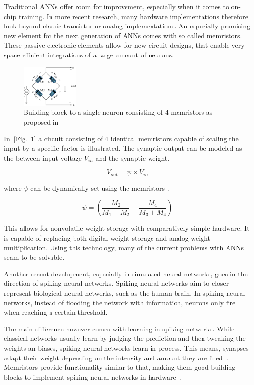 \documentclass[conference]{IEEEtran}
\begin{document}
    Traditional ANNs offer room for improvement, especially when it comes to on-chip training.
    In more recent research, many hardware implementations therefore look beyond classic transistor or analog implementations.
    An especially promising new element for the next generation of ANNs comes with so called memristors.
    These passive electronic elements allow for new circuit designs, that enable very space efficient integrations of a large amount of neurons.

    \begin{figure}[h]
        \centering
        \includegraphics[width=0.25\textwidth]{resources/memristor.png}
        \caption{Building block to a single neuron consisting of 4 memristors as proposed in \cite[Fig.~1]{adhikari2012memristor}}
        \label{fig:memristor}
    \end{figure}

    In~[Fig.~\ref{fig:memristor}] a circuit consisting of 4 identical memristors capable of scaling the input by a specific factor is illustrated.
    The synaptic output can be modeled as the between input voltage $V_{in}$ and the synaptic weight.

    \[V_{out} = \psi \times V_{in}\]

    where $\psi$ can be dynamically set using the memristors \cite{adhikari2012memristor}.

    \[\psi = \left(\frac{M_2}{M_1+M_2} - \frac{M_4}{M_3+M_4}\right)\]

    This allows for nonvolatile weight storage with comparatively simple hardware.
    It is capable of replacing both digital weight storage and analog weight multiplication.
    Using this technology, many of the current problems with ANNs seam to be solvable.

    Another recent development, especially in simulated neural networks, goes in the direction of spiking neural networks.
    Spiking neural networks aim to closer represent biological neural networks, such as the human brain.
    In spiking neural networks, instead of flooding the network with information, neurons only fire when reaching a certain threshold.

    The main difference however comes with learning in spiking networks.
    While classical networks usually learn by judging the prediction and then tweaking the weights an biases, spiking neural networks learn in process.
    This means, synapses adapt their weight depending on the intensity and amount they are fired~\cite{carrillo2012scalable}.
    Memristors provide functionality similar to that, making them good building blocks to implement spiking neural networks in hardware~\cite{querlioz2011simulation}.
\end{document}
